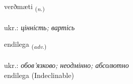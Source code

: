 \documentclass[frontgrid, backgrid]{flacards}\usepackage[]{graphicx}\usepackage[]{xcolor}
\begin{document}
\renewcommand{\flhead}{\vskip5pt \fboxsep=0pt {\small\bfseries\footnotesize Nafnorð | іменник}}
\renewcommand{\fcfoot}{\vskip5pt \fboxsep=0pt \hspace{2pt}{\small\bfseries\footnotesize 2K}}

\renewcommand{\blhead}{\vskip5pt {\small\bfseries\footnotesize Nafnorð | іменник }}
\renewcommand{\bcfoot}{\vskip5pt \hspace{2pt}{\small\bfseries\footnotesize 2K}}


{verðmæti \small{\textsubscript{(\textit{n.})}} \\[1ex] %
\textphonetic{[vɛrðmaitɪ]} \\
ukr.: \emph{цінність; вартісь} \\  [2ex]
\renewcommand*{\arraystretch}{0.8}
}


\renewcommand{\flhead}{\vskip5pt \fboxsep=0pt {\small\bfseries\footnotesize Atviksorð | прислівник}}
\renewcommand{\fcfoot}{\vskip5pt \fboxsep=0pt \hspace{2pt}{\small\bfseries\footnotesize 2K}}

\renewcommand{\blhead}{\vskip5pt {\small\bfseries\footnotesize Atviksorð | прислівник }}
\renewcommand{\bcfoot}{\vskip5pt \hspace{2pt}{\small\bfseries\footnotesize 2K}}


{endilega \small{\textsubscript{(\textit{adv.})}} \\[1ex]
\textphonetic{[ɛntɪlɛɣa]} \\
ukr.: \emph{обов'язково; неодмінно; абсолютно} \\  [2ex]
endilega (Indeclinable)}
\end{document}
